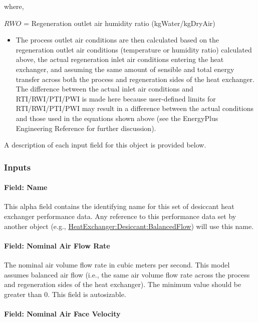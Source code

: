 where,

\(RWO\) = Regeneration outlet air humidity ratio (kgWater/kgDryAir)

\begin{itemize}
\tightlist
\item
  The process outlet air conditions are then calculated based on the regeneration outlet air conditions (temperature or humidity ratio) calculated above, the actual regeneration inlet air conditions entering the heat exchanger, and assuming the same amount of sensible and total energy transfer across both the process and regeneration sides of the heat exchanger. The difference between the actual inlet air conditions and RTI/RWI/PTI/PWI is made here because user-defined limits for RTI/RWI/PTI/PWI may result in a difference between the actual conditions and those used in the equations shown above (see the EnergyPlus Engineering Reference for further discussion).
\end{itemize}

A description of each input field for this object is provided below.

\subsubsection{Inputs}\label{inputs-3-016}

\paragraph{Field: Name}\label{field-name-3-014}

This alpha field contains the identifying name for this set of desiccant heat exchanger performance data. Any reference to this performance data set by another object (e.g., \hyperref[heatexchangerdesiccantbalancedflow]{HeatExchanger:Desiccant:BalancedFlow}) will use this name.

\paragraph{Field: Nominal Air Flow Rate}\label{field-nominal-air-flow-rate}

The nominal air volume flow rate in cubic meters per second. This model assumes balanced air flow (i.e., the same air volume flow rate across the process and regeneration sides of the heat exchanger). The minimum value should be greater than 0. This field is autosizable.

\paragraph{Field: Nominal Air Face Velocity}\label{field-nominal-air-face-velocity}

